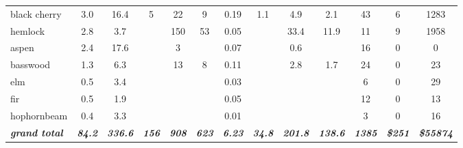 \documentclass[landscape]{article}
\begin{document}
\begin{table}[H]
\begin{tabular}[t]{lcccccccccccc}
black cherry & 3.0 & 16.4 & 5 & 22 & 9 & 0.19 & 1.1 & 4.9 & 2.1 & 43 & 6 & 1283\\
 
\rowcolor{gray!6}  hemlock & 2.8 & 3.7 &  & 150 & 53 & 0.05 &  & 33.4 & 11.9 & 11 & 9 & 1958\\
 
aspen & 2.4 & 17.6 &  & 3 &  & 0.07 &  & 0.6 &  & 16 & 0 & 0\\
 
\rowcolor{gray!6}  basswood & 1.3 & 6.3 &  & 13 & 8 & 0.11 &  & 2.8 & 1.7 & 24 & 0 & 23\\
 
elm & 0.5 & 3.4 &  &  &  & 0.03 &  &  &  & 6 & 0 & 29\\
 
\rowcolor{gray!6}  fir & 0.5 & 1.9 &  &  &  & 0.05 &  &  &  & 12 & 0 & 13\\
 
hophornbeam & 0.4 & 3.3 &  &  &  & 0.01 &  &  &  & 3 & 0 & 16\\
 
\rowcolor{gray!6}  \rowcolor[HTML]{DCDCDC}  \em{\textbf{grand total}} & \em{\textbf{84.2}} & \em{\textbf{336.6}} & \em{\textbf{156}} & \em{\textbf{908}} & \em{\textbf{623}} & \em{\textbf{6.23}} & \em{\textbf{34.8}} & \em{\textbf{201.8}} & \em{\textbf{138.6}} & \em{\textbf{1385}} & \em{\textbf{\$251}} & \em{\textbf{\$55874}}\\
\bottomrule
\end{tabular}
\end{table}
\end{document}
